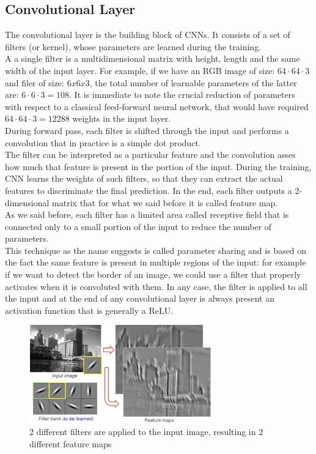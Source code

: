 \documentclass[LaM,binding=0.6cm]{sapthesis}
\begin{document}
\subsection{Convolutional Layer}
The convolutional layer is the building block of CNNs. It consists of a set of filters (or kernel), whose parameters are learned during the training.\\A a single filter is a multidimensional matrix with height, length and the same width of the input layer. For example, if we have an RGB image of size: $64\cdot64\cdot3$ and filer of size: $6x6x3$, the total number of learnable parameters of the latter are: $6\cdot6\cdot3=108$. It is immediate to note the crucial reduction of parameters with respect to a classical feed-forward neural network, that would have required $64\cdot64\cdot 3=12288$ weights in the input layer.\\During forward pass, each filter is shifted through the input and performs a convolution that in practice is a simple dot product.\\The filter can be interpreted as a particular feature and the convolution asses how much that feature is present in the portion of the input. During the training, CNN learns the weights of such filters, so that they can extract the actual features to discriminate the final prediction. In the end, each filter outputs a 2-dimensional matrix that for what we said before it is called feature map.\\As we said before, each filter has a limited area called receptive field that is connected only to a small portion of the input to reduce the number of parameters.\\This technique as the name suggests is called parameter sharing and is based on the fact the same feature is present in multiple regions of the input: for example if we want to detect the border of an image, we could use a filter that properly activates when it is convoluted with them. In any case, the filter is applied to all the input and at the end of any convolutional layer is always present an activation function that is generally a ReLU.
\begin{figure}[H]  \centering
    \includegraphics[width=80mm,scale=0.7]{exfilter}
    \caption{2 different filters are applied to the input image, resulting in 2 different feature maps \cite{cnnstackoverflow}}
    \label{fig:exfilter}
\end{figure}
\end{document}
